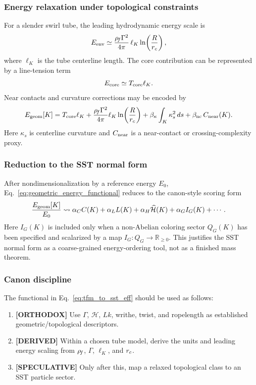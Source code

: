 \subsubsection{Energy relaxation under topological constraints}
For a slender swirl tube, the leading hydrodynamic energy scale is
\begin{equation}
    E_{\rm env}
    \simeq
    \frac{\rho_{\!f}\Gamma^2}{4\pi}\,\ell_K\ln\!\left(\frac{R}{r_c}\right),
    \label{eq:env_energy_tfm}
\end{equation}
where $\ell_K$ is the tube centerline length. The core contribution can be represented by a line-tension term
\begin{equation}
    E_{\rm core}\simeq T_{\rm core}\ell_K.
    \label{eq:core_line_tension}
\end{equation}
Near contacts and curvature corrections may be encoded by
\begin{equation}
    E_{\rm geom}[K]
    =T_{\rm core}\ell_K
    +\frac{\rho_{\!f}\Gamma^2}{4\pi}\ell_K\ln\!\left(\frac{R}{r_c}\right)
    +\beta_{\kappa}\int_K \kappa_s^2\,ds
    +\beta_{\rm nc}\,C_{\rm near}(K).
    \label{eq:geometric_energy_functional}
\end{equation}
Here $\kappa_s$ is centerline curvature and $C_{\rm near}$ is a near-contact or crossing-complexity proxy.

\subsubsection{Reduction to the SST normal form}
After nondimensionalization by a reference energy $E_0$, Eq.~\eqref{eq:geometric_energy_functional} reduces to the canon-style scoring form
\begin{equation}
    \frac{E_{\rm geom}[K]}{E_0}
    \leadsto
    \alpha_C C(K)+\alpha_L L(K)+\alpha_H\widehat{\mathcal H}(K)+\alpha_G I_G(K)+\cdots.
    \label{eq:tfm_to_sst_eff}
\end{equation}
Here $I_G(K)$ is included only when a non-Abelian coloring sector $Q_G(K)$ has been specified and scalarized by a map $I_G:Q_G\to\mathbb R_{\ge0}$. This justifies the SST normal form as a coarse-grained energy-ordering tool, not as a finished mass theorem.

\subsubsection{Canon discipline}
The functional in Eq.~\eqref{eq:tfm_to_sst_eff} should be used as follows:
\begin{enumerate}
    \item \textbf{[ORTHODOX]} Use $\Gamma$, $\mathcal H$, $Lk$, writhe, twist, and ropelength as established geometric/topological descriptors.
    \item \textbf{[DERIVED]} Within a chosen tube model, derive the units and leading energy scaling from $\rho_{\!f}$, $\Gamma$, $\ell_K$, and $r_c$.
    \item \textbf{[SPECULATIVE]} Only after this, map a relaxed topological class to an SST particle sector.
\end{enumerate}

